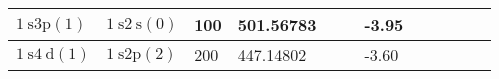 \begin{adjustwidth}{-1cm}{-1cm}
\begin{adjustbox}{width=1.5\textwidth, center}
\begin{tabular}{|l|l|l|l|l|l|l|l|l|l|l|l|}
            \hline $1 \mathrm{~s} 3 \mathrm{p}(1)$  & $1 \mathrm{~s} 2 \mathrm{~s}(0)$ & 100                & 501.56783                                &                                  &                              & -3.95                        &                    &                    & \\
            \hline $1 \mathrm{~s} 4 \mathrm{~d}(1)$ & $1 \mathrm{~s} 2 \mathrm{p}(2)$  & 200                & 447.14802                                &                                  &                              & -3.60                        &                    &                    & \\
            \hline
        \end{tabular}

    \end{adjustbox}

\end{adjustwidth}